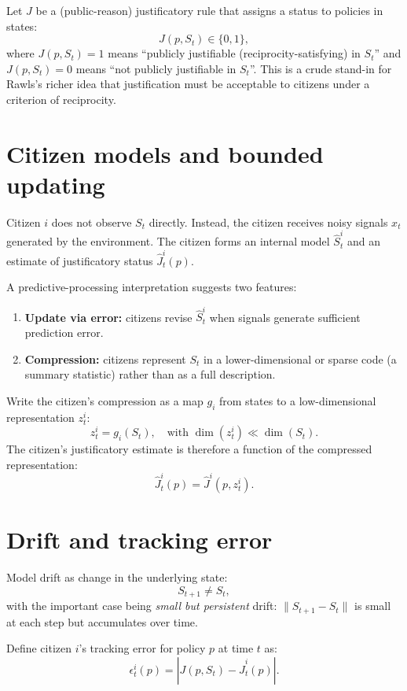 \documentclass[12pt]{report}
\begin{document}
Let $J$ be a (public-reason) justificatory rule that assigns a status to policies in states:
\[
J(p,S_t) \in \{0,1\},
\]
where $J(p,S_t)=1$ means \enquote{publicly justifiable (reciprocity-satisfying) in $S_t$} and $J(p,S_t)=0$ means \enquote{not publicly justifiable in $S_t$}. This is a crude stand-in for Rawls's richer idea that justification must be acceptable to citizens under a criterion of reciprocity. \parencite[pp.~446--447]{rawls2005political}

\section{Citizen models and bounded updating}

Citizen $i$ does not observe $S_t$ directly. Instead, the citizen receives noisy signals $x_t$ generated by the environment. The citizen forms an internal model $\widehat{S}^i_t$ and an estimate of justificatory status $\widehat{J}^i_t(p)$.

A predictive-processing interpretation suggests two features:

\begin{enumerate}[leftmargin=*, itemsep=0.4em]
    \item \textbf{Update via error:} citizens revise $\widehat{S}^i_t$ when signals generate sufficient prediction error. \parencite[p.~816]{friston2005theory}
    \item \textbf{Compression:} citizens represent $S_t$ in a lower-dimensional or sparse code (a summary statistic) rather than as a full description. \parencite[pp.~491--492]{ganguli2012compressed}
\end{enumerate}

Write the citizen's compression as a map $g_i$ from states to a low-dimensional representation $z^i_t$:
\[
z^i_t = g_i(S_t), \quad \text{with } \dim(z^i_t) \ll \dim(S_t).
\]
The citizen's justificatory estimate is therefore a function of the compressed representation:
\[
\widehat{J}^i_t(p) = \widehat{J}^i(p, z^i_t).
\]

\section{Drift and tracking error}

Model drift as change in the underlying state:
\[
S_{t+1} \neq S_t,
\]
with the important case being \emph{small but persistent} drift: $\|S_{t+1}-S_t\|$ is small at each step but accumulates over time.

Define citizen $i$'s tracking error for policy $p$ at time $t$ as:
\[
\epsilon^i_t(p) = \left| J(p,S_t) - \widehat{J}^i_t(p) \right|.
\]
\end{document}
